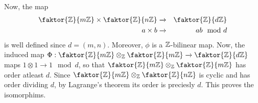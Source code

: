 \begin{example}
\begin{enumerate}
            Now, the map
            \begin{eqnarray*}
                \faktor{\Z}{m\Z} \times \faktor{\Z}{n\Z} & \xrightarrow{} &
                                             \faktor{\Z}{d\Z}   \\
                a \times b     & \xrightarrow{} & ab \mod{d}   \\
            \end{eqnarray*}
            is well defined since $d=(m,n)$. Moreover, $\phi$ is a $\mathbb{Z}$-bilinear
            map. Now, the induced map $\Phi:\faktor{\Z}{m\Z} \otimes_\Z
            \faktor{\Z}{m\Z} \xrightarrow{} \faktor{\Z}{d\Z}$ maps $1 \otimes 1
            \xrightarrow{} 1 \mod{d}$, so that $\faktor{\Z}{m\Z} \otimes_\Z
            \faktor{\Z}{m\Z}$ has order atleast $d$. Since $\faktor{\Z}{m\Z}
            \otimes_\Z \faktor{\Z}{n\Z}$ is cyclic and has order dividing $d$,
            by Lagrange's theorem its order is preciesly $d$. This proves the
            isomorphims.
    \end{enumerate}
\end{example}
